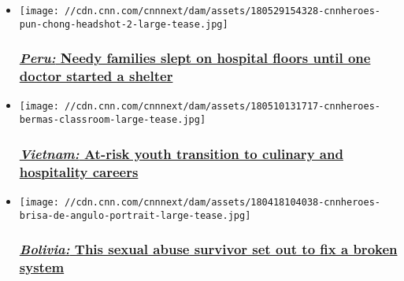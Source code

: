 \begin{itemize}
\item
  \href{/2018/05/31/health/cnnheroes-ricardo-pun-chong-inspira/index.html}{}

  \texttt{[image: //cdn.cnn.com/cnnnext/dam/assets/180529154328-cnnheroes-pun-chong-headshot-2-large-tease.jpg]}

  \hypertarget{peru-needy-families-slept-on-hospital-floors-until-one-doctor-started-a-shelter}{%
  \subsubsection{\texorpdfstring{\href{/2018/05/31/health/cnnheroes-ricardo-pun-chong-inspira/index.html}{\emph{Peru:}
  Needy families slept on hospital floors until one doctor started a
  shelter}}{Peru: Needy families slept on hospital floors until one doctor started a shelter}}\label{peru-needy-families-slept-on-hospital-floors-until-one-doctor-started-a-shelter}}
\item
  \href{/2018/05/10/world/cnnheroes-neal-bermas-streets-international/index.html}{}

  \texttt{[image: //cdn.cnn.com/cnnnext/dam/assets/180510131717-cnnheroes-bermas-classroom-large-tease.jpg]}

  \hypertarget{vietnam-at-risk-youth-transition-to-culinary-and-hospitality-careers}{%
  \subsubsection{\texorpdfstring{\href{/2018/05/10/world/cnnheroes-neal-bermas-streets-international/index.html}{\emph{Vietnam:}
  At-risk youth transition to culinary and hospitality
  careers}}{Vietnam: At-risk youth transition to culinary and hospitality careers}}\label{vietnam-at-risk-youth-transition-to-culinary-and-hospitality-careers}}
\item
  \href{/2018/04/19/world/cnnheroes-brisa-de-angulo-a-breeze-of-hope-foundation/index.html}{}

  \texttt{[image: //cdn.cnn.com/cnnnext/dam/assets/180418104038-cnnheroes-brisa-de-angulo-portrait-large-tease.jpg]}

  \hypertarget{bolivia-this-sexual-abuse-survivor-set-out-to-fix-a-broken-system}{%
  \subsubsection{\texorpdfstring{\href{/2018/04/19/world/cnnheroes-brisa-de-angulo-a-breeze-of-hope-foundation/index.html}{\emph{Bolivia:}
  This sexual abuse survivor set out to fix a broken
  system}}{Bolivia: This sexual abuse survivor set out to fix a broken system}}\label{bolivia-this-sexual-abuse-survivor-set-out-to-fix-a-broken-system}}
\end{itemize}

